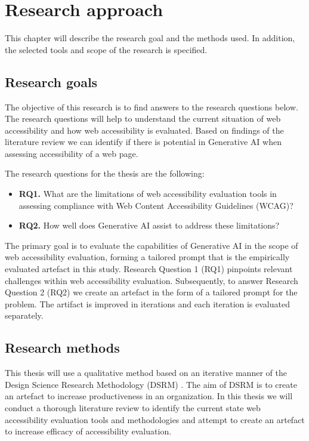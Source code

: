 \chapter{Research approach\label{methods}}

This chapter will describe the research goal and the methods used. In addition, the selected tools and scope of the research is specified.

\section{Research goals}

The objective of this research is to find answers to the research questions below. The research questions will help to understand the current situation of web accessibility and how web accessibility is evaluated. Based on findings of the literature review we can identify if there is potential in Generative AI when assessing accessibility of a web page. 

The research questions for the thesis are the following:

\begin{itemize}
    \item \textbf{RQ1.} What are the limitations of web accessibility evaluation tools in assessing compliance with Web Content Accessibility Guidelines (WCAG)?
    \item \textbf{RQ2.} How well does Generative AI assist to address these limitations?
\end{itemize}

The primary goal is to evaluate the capabilities of Generative AI in the scope of web accessibility evaluation, forming a tailored prompt that is the empirically evaluated artefact in this study. Research Question 1 (RQ1) pinpoints relevant challenges within web accessibility evaluation. Subsequently, to answer Research Question 2 (RQ2) we create an artefact in the form of a tailored prompt for the problem. The artifact is improved in iterations and each iteration is evaluated separately.

\section{Research methods}

This thesis will use a qualitative method based on an iterative manner of the Design Science Research Methodology (DSRM) \citep{designsciencemethodology, iterativedesignscience}. The aim of DSRM is to create an artefact to increase productiveness in an organization. In this thesis we will conduct a thorough literature review to identify the current state web accessibility evaluation tools and methodologies and attempt to create an artefact to increase efficacy of accessibility evaluation. 

